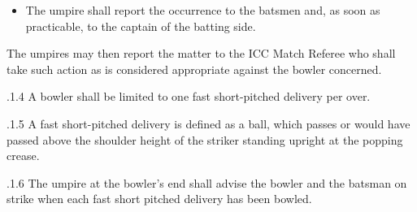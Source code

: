 \documentclass[12pt]{article}
\begin{document}
\vspace{\baselineskip}
\begin{itemize}
	\item {\fontsize{9pt}{10.8pt}\selectfont The umpire shall report the occurrence to the batsmen and, as soon as practicable, to the captain of the batting side.\par}
\end{itemize}\par


\vspace{\baselineskip}
\begin{adjustwidth}{1.12in}{0.07in}
{\fontsize{9pt}{10.8pt}\selectfont The umpires may then report the matter to the ICC Match Referee who shall take such action as is considered appropriate against the bowler concerned.\par}\par

\end{adjustwidth}


\vspace{\baselineskip}
\begin{adjustwidth}{0.49in}{0.0in}
{\fontsize{9pt}{10.8pt}.1.4 \tabto{1.17in} A bowler shall be limited to one fast short-pitched delivery per over.\par}\par

\end{adjustwidth}


\vspace{\baselineskip}
\begin{adjustwidth}{1.18in}{0.06in}
{\fontsize{9pt}{10.8pt}.1.5 \tabto{1.17in} A fast short-pitched delivery is defined as a ball, which passes or would have passed above the shoulder height of the striker standing upright at the popping crease.\par}\par

\end{adjustwidth}


\vspace{\baselineskip}
\begin{adjustwidth}{1.18in}{0.19in}
{\fontsize{9pt}{10.8pt}.1.6 \tabto{1.17in} The umpire at the bowler’s end shall advise the bowler and the batsman on strike when each fast short pitched delivery has been bowled.\par}\par

\end{adjustwidth}
\end{document}
